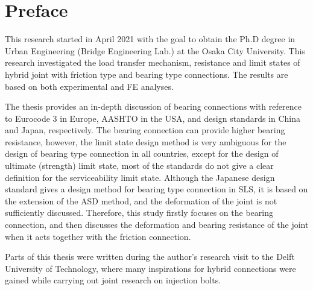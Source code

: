 \cleardoublepage{}
{}\mtcaddchapter 
\chapter*{Preface}
\thispagestyle{plain}
\addtocounter{counter}{-1}


This research started in April 2021 with the goal to obtain the Ph.D degree in Urban Engineering (Bridge Engineering Lab.) at the Osaka City University. This research investigated the load transfer mechanism, resistance and limit states of hybrid joint with friction type and bearing type connections. The results are based on both experimental and FE analyses.

The thesis provides an in-depth discussion of bearing connections with reference to Eurocode 3 in Europe, AASHTO in the USA, and design standards in China and Japan, respectively. The bearing connection can provide higher bearing resistance, however, the limit state design method is very ambiguous for the design of bearing type connection in all countries, except for the design of ultimate (strength) limit state, most of the standards do not give a clear definition for the serviceability limit state. Although the Japanese design standard gives a design method for bearing type connection in SLS, it is based on the extension of the ASD method, and the deformation of the joint is not sufficiently discussed. Therefore, this study firstly focuses on the bearing connection, and then discusses the deformation and bearing resistance of the joint when it acts together with the friction connection.

Parts of this thesis were written during the author's research visit to the Delft University of Technology, where many inspirations for hybrid connections were gained while carrying out joint research on injection bolts.

